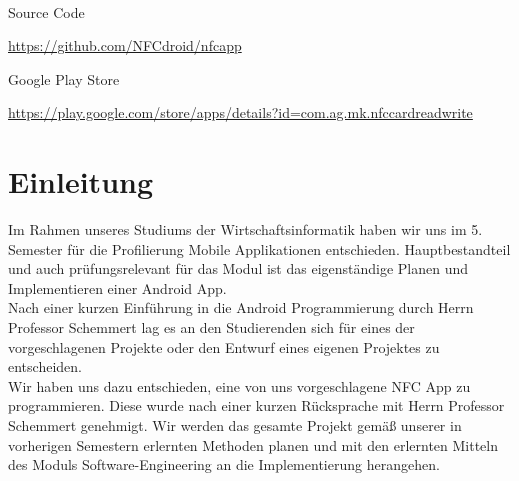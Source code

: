 \documentclass[a4paper,ngerman,12pt]{scrreprt}
\begin{document}
\begin{titlepage}
\begin{center}
		\\[2cm]
		\begin{minipage}{0.2\textwidth}
			\begin{flushleft}
				{\footnotesize Source Code}
			\end{flushleft}
		\end{minipage}
		\hfill
		\begin{minipage}{0.75\textwidth}
			\begin{flushleft}
				{\normalsize
				\url{https://github.com/NFCdroid/nfcapp}
				}
			\end{flushleft}
		\end{minipage}
		\begin{minipage}{0.2\textwidth}
			\begin{flushleft}
				{\footnotesize Google Play Store}
			\end{flushleft}
		\end{minipage}
		\hfill
		\begin{minipage}{0.75\textwidth}
			\begin{flushleft}
				{\normalsize
					\url{https://play.google.com/store/apps/details?id=com.ag.mk.nfccardreadwrite}
				}
			\end{flushleft}
		\end{minipage}
		\vfill
	\end{center}
\end{titlepage}

\begingroup
\renewcommand*{\chapterpagestyle}{empty}
\pagestyle{empty}
\tableofcontents
\clearpage
\endgroup

\chapter{Einleitung}
 Im Rahmen unseres Studiums der Wirtschaftsinformatik haben wir uns im 5. Semester für die Profilierung Mobile Applikationen entschieden. Hauptbestandteil und auch prüfungsrelevant für das Modul ist das eigenständige Planen und Implementieren einer Android App. \\
 Nach einer kurzen Einführung in die Android Programmierung durch Herrn Professor Schemmert lag es an den Studierenden sich für eines der vorgeschlagenen Projekte oder den Entwurf eines eigenen Projektes zu entscheiden. \\
 Wir haben uns dazu entschieden, eine von uns vorgeschlagene \ac{NFC} App zu programmieren. Diese wurde nach einer kurzen Rücksprache mit Herrn Professor Schemmert genehmigt. \newline
 Wir werden das gesamte Projekt gemäß unserer in vorherigen Semestern erlernten Methoden planen und mit den erlernten Mitteln des Moduls Software-Engineering an die Implementierung herangehen.
\end{document}
